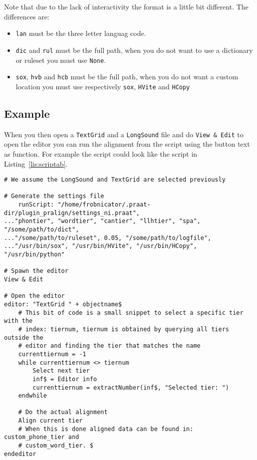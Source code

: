 Note that due to the lack of interactivity the format is a little bit
different. The differences are:
\begin{itemize}
	\item \texttt{lan} must be the three letter languag code.
	\item \texttt{dic} and \texttt{rul} must be the full path, when you do not
want to use a dictionary or ruleset you must use \texttt{None}.
	\item \texttt{sox}, \texttt{hvb} and \texttt{hcb} must be the full path, when
you do not want a custom location you must use respectively \texttt{sox},
\texttt{HVite} and \texttt{HCopy}
\end{itemize}

\subsection{Example}
When you then open a \texttt{TextGrid} and a \texttt{LongSound} file and do
\texttt{View \& Edit} to open the editor you can run the alignment from the
script using the button text as function. For example the script could look
like the script in Listing~\ref{lis:scriptab}.

\begin{lstlisting}[caption={Example scriptability},label={lis:scriptab}]
# We assume the LongSound and TextGrid are selected previously

# Generate the settings file
	runScript: "/home/frobnicator/.praat-dir/plugin_pralign/settings_ni.praat",
..."phontier", "wordtier", "cantier", "llhtier", "spa", "/some/path/to/dict",
..."/some/path/to/ruleset", 0.05, "/some/path/to/logfile",
..."/usr/bin/sox", "/usr/bin/HVite", "/usr/bin/HCopy", "/usr/bin/python"

# Spawn the editor
View & Edit

# Open the editor
editor: "TextGrid " + objectname$
	# This bit of code is a small snippet to select a specific tier with the
	# index: tiernum, tiernum is obtained by querying all tiers outside the
	# editor and finding the tier that matches the name
	currenttiernum = -1
	while currenttiernum <> tiernum
		Select next tier
		inf$ = Editor info
		currenttiernum = extractNumber(inf$, "Selected tier: ")
	endwhile
	
	# Do the actual alignment
	Align current tier
	# When this is done aligned data can be found in: custom_phone_tier and 
	# custom_word_tier. $
endeditor
\end{lstlisting}

